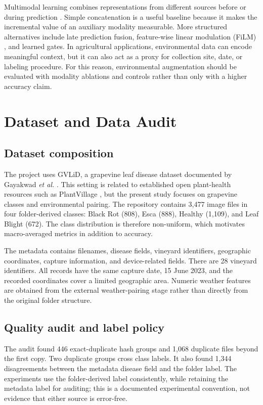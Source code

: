 \documentclass[conference]{IEEEtran}
\begin{document}
Multimodal learning combines representations from different sources before or during prediction \cite{baltrusaitis2019multimodal}. Simple concatenation is a useful baseline because it makes the incremental value of an auxiliary modality measurable. More structured alternatives include late prediction fusion, feature-wise linear modulation (FiLM) \cite{film}, and learned gates. In agricultural applications, environmental data can encode meaningful context, but it can also act as a proxy for collection site, date, or labeling procedure. For this reason, environmental augmentation should be evaluated with modality ablations and controls rather than only with a higher accuracy claim.

\section{Dataset and Data Audit}
\subsection{Dataset composition}
The project uses GVLiD, a grapevine leaf disease dataset documented by Gayakwad \textit{et al.} \cite{gvlid}. This setting is related to established open plant-health resources such as PlantVillage \cite{plantvillage}, but the present study focuses on grapevine classes and environmental pairing. The repository contains 3,477 image files in four folder-derived classes: Black Rot (808), Esca (888), Healthy (1,109), and Leaf Blight (672). The class distribution is therefore non-uniform, which motivates macro-averaged metrics in addition to accuracy.

The metadata contains filenames, disease fields, vineyard identifiers, geographic coordinates, capture information, and device-related fields. There are 28 vineyard identifiers. All records have the same capture date, 15 June 2023, and the recorded coordinates cover a limited geographic area. Numeric weather features are obtained from the external weather-pairing stage rather than directly from the original folder structure.

\subsection{Quality audit and label policy}
The audit found 446 exact-duplicate hash groups and 1,068 duplicate files beyond the first copy. Two duplicate groups cross class labels. It also found 1,344 disagreements between the metadata disease field and the folder label. The experiments use the folder-derived label consistently, while retaining the metadata label for auditing; this is a documented experimental convention, not evidence that either source is error-free.
\end{document}
